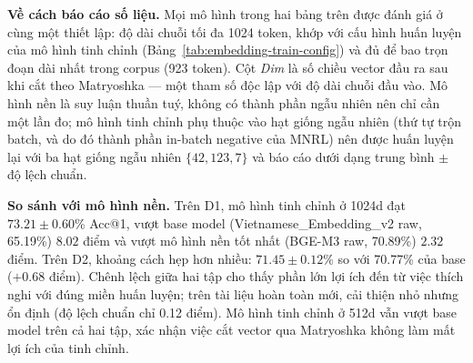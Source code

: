 \documentclass[../DoAn.tex]{subfiles}
\begin{document}
\begin{table}[H]
    \centering
    \caption{Kết quả trên tập D2 (390 câu)}
    \label{tab:embedding-external-benchmark}
    {\scriptsize
    \setlength{\tabcolsep}{3pt}
    }
\end{table}

\textbf{Về cách báo cáo số liệu.} Mọi mô hình trong hai bảng trên được đánh giá ở cùng một thiết lập: độ dài chuỗi tối đa 1024 token, khớp với cấu hình huấn luyện của mô hình tinh chỉnh (Bảng~\ref{tab:embedding-train-config}) và đủ để bao trọn đoạn dài nhất trong corpus (923 token). Cột \emph{Dim} là số chiều vector đầu ra sau khi cắt theo Matryoshka --- một tham số độc lập với độ dài chuỗi đầu vào. Mô hình nền là suy luận thuần tuý, không có thành phần ngẫu nhiên nên chỉ cần một lần đo; mô hình tinh chỉnh phụ thuộc vào hạt giống ngẫu nhiên (thứ tự trộn batch, và do đó thành phần in-batch negative của MNRL) nên được huấn luyện lại với ba hạt giống ngẫu nhiên $\{42, 123, 7\}$ và báo cáo dưới dạng trung bình $\pm$ độ lệch chuẩn.

\textbf{So sánh với mô hình nền.} Trên D1, mô hình tinh chỉnh ở 1024d đạt $73.21 \pm 0.60$\% Acc@1, vượt base model (Vietnamese\_Embedding\_v2 raw, 65.19\%) $8.02$ điểm và vượt mô hình nền tốt nhất (BGE-M3 raw, 70.89\%) $2.32$ điểm. Trên D2, khoảng cách hẹp hơn nhiều: $71.45 \pm 0.12$\% so với 70.77\% của base ($+0.68$ điểm). Chênh lệch giữa hai tập cho thấy phần lớn lợi ích đến từ việc thích nghi với đúng miền huấn luyện; trên tài liệu hoàn toàn mới, cải thiện nhỏ nhưng ổn định (độ lệch chuẩn chỉ 0.12 điểm). Mô hình tinh chỉnh ở 512d vẫn vượt base model trên cả hai tập, xác nhận việc cắt vector qua Matryoshka không làm mất lợi ích của tinh chỉnh.
\end{document}
